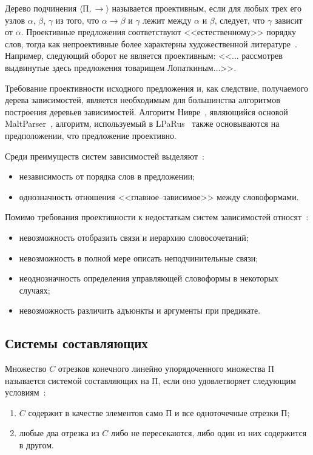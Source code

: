 Дерево подчинения $\langle\textit{П}, \rightarrow\rangle$ называется проективным, если для любых трех его узлов $\alpha$, $\beta$, $\gamma$ из того, что $\alpha \rightarrow \beta$ и $\gamma$ лежит между $\alpha$ и $\beta$, следует, что $\gamma$ зависит от $\alpha$. Проективные предложения соответствуют <<естественному>> порядку слов, тогда как непроективные более характерны художественной литературе~\cite{gladkij1985sintaksicheskie}. Например, следующий оборот не является проективным: <<... рассмотрев выдвинутые здесь предложения товарищем Лопаткиным...>>.

Требование проективности исходного предложения и, как следствие, получаемого дерева зависимостей, является необходимым для большинства алгоритмов построения деревьев зависимостей. Алгоритм Нивре~\cite{nivre2003efficient}, являющийся основой MaltParser~\cite{nivre2007maltparser}, алгоритм, используемый в LPaRus~\cite{kiselev2017sintaksicheskij} также основываются на предположении, что предложение проективно.

Среди преимуществ систем зависимостей выделяют~\cite{gladkij1985sintaksicheskie,Testelets2001,nivre2003efficient}:
\begin{itemize}
	\item независимость от порядка слов в предложении;
	\item однозначность отношения <<главное--зависимое>> между словоформами.
\end{itemize}

Помимо требования проективности к недостаткам систем зависимостей относят~\cite{gladkij1985sintaksicheskie,Testelets2001,kiselev2017sintaksicheskij,Grashchenkov2024RuConst}:
\begin{itemize}
	\item невозможность отобразить связи и иерархию словосочетаний;
	\item невозможность в полной мере описать неподчинительные связи;
	\item неоднозначность определения управляющей словоформы в некоторых случаях;
	\item невозможность различить адъюнкты и аргументы при предикате.
\end{itemize}



\subsection{Системы составляющих}

Множество $C$ отрезков конечного линейно упорядоченного множества $\textit{П}$ называется системой составляющих на $\textit{П}$, если оно удовлетворяет следующим условиям~\cite{gladkij1985sintaksicheskie}:
\begin{enumerate}
	\item $C$ содержит в качестве элементов само $\textit{П}$ и все одноточечные отрезки $\textit{П}$;
	\item любые два отрезка из $C$ либо не пересекаются, либо один из них содержится в другом.
\end{enumerate}

